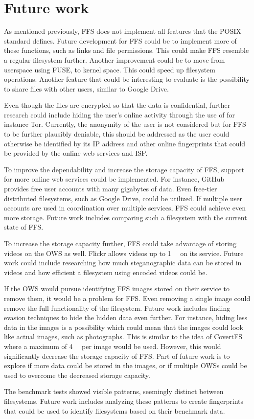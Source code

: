 
\section{Future work}
\label{sec:futureWork}
As mentioned previously, \gls{FFS} does not implement all features that the POSIX standard defines. Future development for \gls{FFS} could be to implement more of these functions, such as links and file permissions. This could make \gls{FFS} resemble a regular filesystem further. Another improvement could be to move from userspace using \gls{FUSE}, to kernel space. This could speed up filesystem operations. Another feature that could be interesting to evaluate is the possibility to share files with other users, similar to Google Drive.

Even though the files are encrypted so that the data is confidential, further research could include hiding the user's online activity through the use of for instance Tor. Currently, the anonymity of the user is not considered but for \gls{FFS} to be further plausibly deniable, this should be addressed as the user could otherwise be identified by its IP address and other online fingerprints that could be provided by the online web services and \gls{ISP}.

To improve the dependability and increase the storage capacity of \gls{FFS}, support for more online web services could be implemented. For instance, GitHub provides free user accounts with many gigabytes of data. Even \mbox{free-tier} distributed filesystems, such as Google Drive, could be utilized. If multiple user accounts are used in coordination over multiple services, \gls{FFS} could achieve even more storage. Future work includes comparing such a filesystem with the current state of \gls{FFS}.

To increase the storage capacity further, \gls{FFS} could take advantage of storing videos on the \gls{OWS} as well. Flickr allows videos up to \SI[per-mode = symbol]{1}{\giga\byte} on its service. Future work could include researching how much steganographic data can be stored in videos and how efficient a filesystem using encoded videos could be.

If the \gls{OWS} would pursue identifying \gls{FFS} images stored on their service to remove them, it would be a problem for \gls{FFS}. Even removing a single image could remove the full functionality of the filesystem. Future work includes finding evasion techniques to hide the hidden data even further. For instance, hiding less data in the images is a possibility which could mean that the images could look like actual images, such as photographs. This is similar to the idea of CovertFS\,\cite{baliga2007web} where a maximum of \SI[per-mode = symbol]{4}{\kilo\byte} per image would be used. However, this would significantly decrease the storage capacity of \gls{FFS}. Part of future work is to explore if more data could be stored in the images, or if multiple \gls{OWS}s could be used to overcome the decreased storage capacity. 

The benchmark tests showed visible patterns, seemingly distinct between filesystems. Future work includes analyzing these patterns to create fingerprints that could be used to identify filesystems based on their benchmark data.
